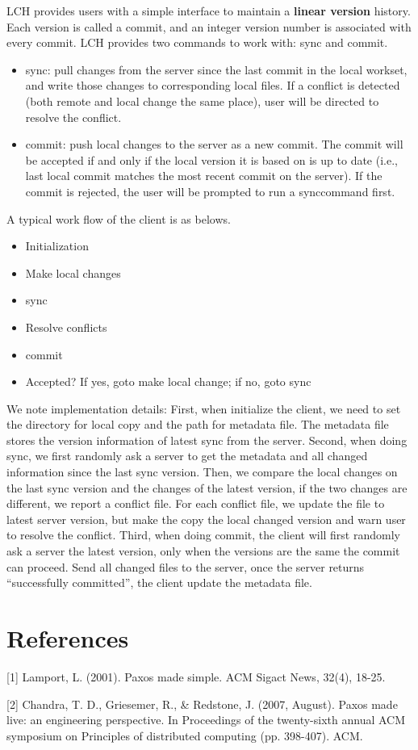 \documentclass[11pt]{article}
\begin{document}
LCH provides users with a simple interface to maintain a \textbf{linear version} history. Each version is called a commit, and an integer version number is associated with every commit. LCH provides two commands to work with: sync and commit. 
\begin{itemize}
  \item sync: pull changes from the server since the last commit in the local workset, and write those changes to corresponding local files. If a conflict is detected (both remote and local change the same place), user will be directed to resolve the conflict.
  \item commit: push local changes to the server as a new commit. The commit will be accepted if and only if the local version it is based on is up to date (i.e., last local commit matches the most recent commit on the server). If the commit is rejected, the user will be prompted to run a synccommand first.
\end{itemize}
A typical work flow of the client is as belows.
\begin{itemize}
  \item Initialization
  \item Make local changes
  \item sync
  \item Resolve conflicts
  \item commit
  \item Accepted? If yes, goto make local change; if no, goto sync
\end{itemize}

We note implementation details: First, when initialize the client, we need to set the directory for local copy and the path for metadata file. The metadata file stores the version information of latest sync from the server. Second, when doing sync, we first randomly ask a server to get the metadata and all changed information since the last sync version. Then, we compare the local changes on the last sync version and the changes of the latest version, if the two changes are different, we report a conflict file. For each conflict file, we update the file to latest server version, but make the copy the local changed version and warn user to resolve the conflict. Third, when doing commit, the client will first randomly ask a server the latest version, only when the versions are the same the commit can proceed. Send all changed files to the server, once the server returns ``successfully committed'', the client update the metadata file.

\section{References}

[1] Lamport, L. (2001). Paxos made simple. ACM Sigact News, 32(4), 18-25.

[2] Chandra, T. D., Griesemer, R., \& Redstone, J. (2007, August). Paxos made live: an engineering perspective. In Proceedings of the twenty-sixth annual ACM symposium on Principles of distributed computing (pp. 398-407). ACM.
\end{document}
